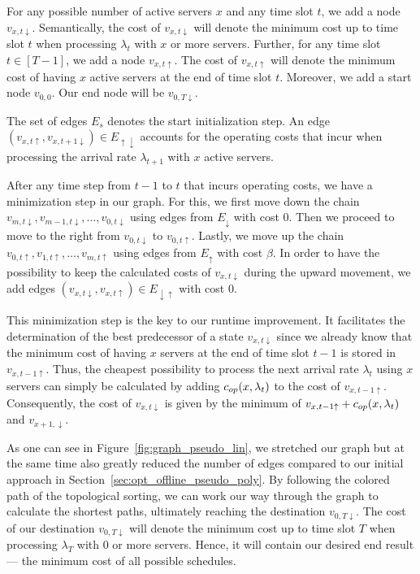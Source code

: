 For any possible number of active servers $x$ and any time slot $t$, we add a node $v_{x,t\downarrow}$. Semantically, the cost of $v_{x,t\downarrow}$ will denote the minimum cost up to time slot $t$ when processing $\lambda_t$ with $x$ or more servers. Further, for any time slot $t\in[T-1]$, we add a node $v_{x,t\uparrow}$. The cost of $v_{x,t\uparrow}$ will denote the minimum cost of having $x$ active servers at the end of time slot $t$. Moreover, we add a start node $v_{0,0}$. Our end node will be $v_{0,T\downarrow}$.

The set of edges $E_s$ denotes the start initialization step. An edge $(v_{x,t\uparrow},v_{x,t+1\downarrow})\in E_{\uparrow\downarrow}$ accounts for the operating costs that incur when processing the arrival rate $\lambda_{t+1}$ with $x$ active servers.

After any time step from $t-1$ to $t$ that incurs operating costs, we have a minimization step in our graph. For this, we first move down the chain $v_{m,t\downarrow},v_{m-1,t\downarrow},\ldots,v_{0,t\downarrow}$ using edges from $E_\downarrow$ with cost $0$. Then we proceed to move to the right from $v_{0,t\downarrow}$ to $v_{0,t\uparrow}$. Lastly, we move up the chain $v_{0,t\uparrow},v_{1,t\uparrow},\ldots,v_{m,t\uparrow}$ using edges from $E_\uparrow$ with cost $\beta$. In order to have the possibility to keep the calculated costs of $v_{x,t\downarrow}$ during the upward movement, we add edges $(v_{x,t\downarrow},v_{x,t\uparrow})\in E_{\downarrow\uparrow}$ with cost $0$.

This minimization step is the key to our runtime improvement. It facilitates the determination of the best predecessor of a state $v_{x,t\downarrow}$ since we already know that the minimum cost of having $x$ servers at the end of time slot $t-1$ is stored in $v_{x,t-1\uparrow}$. Thus, the cheapest possibility to process the next arrival rate $\lambda_t$ using $x$ servers can simply be calculated by adding $c_{op}(x,\lambda_t)$ to the cost of $v_{x,t-1\uparrow}$. Consequently, the cost of $v_{x,t\downarrow}$ is given by the minimum of $v_{x,t-1\uparrow}+c_{op}(x,\lambda_t)$ and $v_{x+1,\downarrow}$.

As one can see in Figure~\ref{fig:graph_pseudo_lin}, we stretched our graph but at the same time also greatly reduced the number of edges compared to our initial approach in Section~\ref{sec:opt_offline_pseudo_poly}. By following the colored path of the topological sorting, we can work our way through the graph to calculate the shortest paths, ultimately reaching the destination $v_{0,T\downarrow}$. The cost of our destination $v_{0,T\downarrow}$ will denote the minimum cost up to time slot $T$ when processing $\lambda_T$ with 0 or more servers. Hence, it will contain our desired end result --- the minimum cost of all possible schedules.

